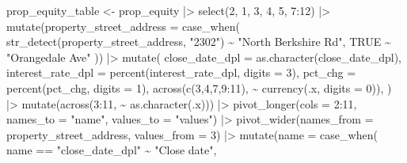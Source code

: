 \documentclass[
  letterpaper,
  DIV=11,
  numbers=noendperiod]{scrartcl}
\newenvironment{Shaded}{\begin{snugshade}}{\end{snugshade}}
\newcommand{\AttributeTok}[1]{\textcolor[rgb]{0.40,0.45,0.13}{#1}}
\newcommand{\ConstantTok}[1]{\textcolor[rgb]{0.56,0.35,0.01}{#1}}
\newcommand{\DecValTok}[1]{\textcolor[rgb]{0.68,0.00,0.00}{#1}}
\newcommand{\FunctionTok}[1]{\textcolor[rgb]{0.28,0.35,0.67}{#1}}
\newcommand{\NormalTok}[1]{\textcolor[rgb]{0.00,0.23,0.31}{#1}}
\newcommand{\OtherTok}[1]{\textcolor[rgb]{0.00,0.23,0.31}{#1}}
\newcommand{\SpecialCharTok}[1]{\textcolor[rgb]{0.37,0.37,0.37}{#1}}
\newcommand{\StringTok}[1]{\textcolor[rgb]{0.13,0.47,0.30}{#1}}
\begin{document}
\begin{Shaded}
\begin{Highlighting}[]
\NormalTok{prop\_equity\_table }\OtherTok{\textless{}{-}}\NormalTok{ prop\_equity }\SpecialCharTok{|\textgreater{}} 
  \FunctionTok{select}\NormalTok{(}\DecValTok{2}\NormalTok{, }\DecValTok{1}\NormalTok{, }\DecValTok{3}\NormalTok{, }\DecValTok{4}\NormalTok{, }\DecValTok{5}\NormalTok{, }\DecValTok{7}\SpecialCharTok{:}\DecValTok{12}\NormalTok{) }\SpecialCharTok{|\textgreater{}} 
  \FunctionTok{mutate}\NormalTok{(}\AttributeTok{property\_street\_address =} \FunctionTok{case\_when}\NormalTok{(}
    \FunctionTok{str\_detect}\NormalTok{(property\_street\_address, }\StringTok{"2302"}\NormalTok{) }\SpecialCharTok{\textasciitilde{}} \StringTok{"North Berkshire Rd"}\NormalTok{,}
    \ConstantTok{TRUE} \SpecialCharTok{\textasciitilde{}} \StringTok{"Orangedale Ave"}
\NormalTok{  )) }\SpecialCharTok{|\textgreater{}} 
  \FunctionTok{mutate}\NormalTok{(}
    \AttributeTok{close\_date\_dpl =} \FunctionTok{as.character}\NormalTok{(close\_date\_dpl),}
    \AttributeTok{interest\_rate\_dpl =} \FunctionTok{percent}\NormalTok{(interest\_rate\_dpl, }\AttributeTok{digits =} \DecValTok{3}\NormalTok{),}
    \AttributeTok{pct\_chg =} \FunctionTok{percent}\NormalTok{(pct\_chg, }\AttributeTok{digits =} \DecValTok{1}\NormalTok{),}
    \FunctionTok{across}\NormalTok{(}\FunctionTok{c}\NormalTok{(}\DecValTok{3}\NormalTok{,}\DecValTok{4}\NormalTok{,}\DecValTok{7}\NormalTok{,}\DecValTok{9}\SpecialCharTok{:}\DecValTok{11}\NormalTok{), }\SpecialCharTok{\textasciitilde{}} \FunctionTok{currency}\NormalTok{(.x, }\AttributeTok{digits =} \DecValTok{0}\NormalTok{)),}
\NormalTok{    ) }\SpecialCharTok{|\textgreater{}} 
  \FunctionTok{mutate}\NormalTok{(}\FunctionTok{across}\NormalTok{(}\DecValTok{3}\SpecialCharTok{:}\DecValTok{11}\NormalTok{, }\SpecialCharTok{\textasciitilde{}} \FunctionTok{as.character}\NormalTok{(.x))) }\SpecialCharTok{|\textgreater{}} 
  \FunctionTok{pivot\_longer}\NormalTok{(}\AttributeTok{cols =} \DecValTok{2}\SpecialCharTok{:}\DecValTok{11}\NormalTok{, }\AttributeTok{names\_to =} \StringTok{"name"}\NormalTok{, }\AttributeTok{values\_to =} \StringTok{"values"}\NormalTok{) }\SpecialCharTok{|\textgreater{}} 
  \FunctionTok{pivot\_wider}\NormalTok{(}\AttributeTok{names\_from =}\NormalTok{ property\_street\_address, }\AttributeTok{values\_from =} \DecValTok{3}\NormalTok{) }\SpecialCharTok{|\textgreater{}} 
  \FunctionTok{mutate}\NormalTok{(}\AttributeTok{name =} \FunctionTok{case\_when}\NormalTok{(}
\NormalTok{    name }\SpecialCharTok{==} \StringTok{"close\_date\_dpl"} \SpecialCharTok{\textasciitilde{}} \StringTok{"Close date"}\NormalTok{,}

\end{Highlighting}
\end{Shaded}
\end{document}
